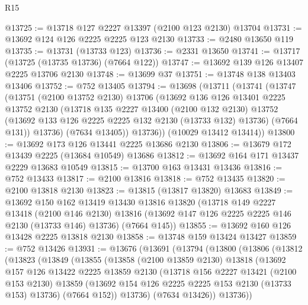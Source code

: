 \begin{lexlean}{R15}
\begin{coremodule}
@13725 := @13718 @127 @2227 @13397 (@2100 @123 @2130) @13704
@13731 := @13692 @124 @126 @2225 @2225 @123 @2130
@13733 := @2480 @13650 @119
@13735 := @13731 (@13733 @123)
@13736 := @2331 @13650
@13741 := @13717 (@13725 (@13735 @13736) (@7664 @122))
@13747 := @13692 @139 @126 @13407 @2225 @13706 @2130
@13748 := @13699 @37
@13751 := @13748 @138 @13403 @13406
@13752 := @752 @13405
@13794 := @13698
    (@13711
      (@13741
        (@13747
          (@13751
            (@2100 @13752 @2130)
            @13706
            (@13692
              @136
              @126
              @13401
              @2225
              @13752
              @2130
              (@13718
                @135
                @2227
                @13400
                (@2100 @132 @2130)
                @13752
                (@13692 @133 @126 @2225 @2225 @132 @2130 (@13733 @132) @13736)
                (@7664 @131))
              @13736)
            (@7634 @13405))
          @13736))
      (@10029 @13412 @13414))
@13800 := @13692 @173 @126 @13441 @2225 @13686 @2130
@13806 := @13679 @172 @13439 @2225 (@13684 @10549) @13686
@13812 := @13692 @164 @171 @13437 @2229 @13683 @10549
@13815 := @13700 @163 @13431 @13436
@13816 := @752 @13433
@13817 := @2100 @13816
@13818 := @752 @13435
@13820 := @2100 @13818 @2130
@13823 := @13815 (@13817 @13820) @13683
@13849 := @13692
    @150
    @162
    @13419
    @13430
    @13816
    @13820
    (@13718
      @149
      @2227
      @13418
      (@2100 @146 @2130)
      @13816
      (@13692 @147 @126 @2225 @2225 @146 @2130 (@13733 @146) @13736)
      (@7664 @145))
@13855 := @13692 @160 @126 @13428 @2225 @13818 @2130
@13858 := @13748 @159 @13424 @13427
@13859 := @752 @13426
@13931 := @13676
    (@13691
      (@13794
        (@13800
          (@13806
            (@13812
              (@13823
                (@13849
                  (@13855
                    (@13858
                      (@2100 @13859 @2130)
                      @13818
                      (@13692
                        @157
                        @126
                        @13422
                        @2225
                        @13859
                        @2130
                        (@13718
                          @156
                          @2227
                          @13421
                          (@2100 @153 @2130)
                          @13859
                          (@13692 @154 @126 @2225 @2225 @153 @2130 (@13733 @153) @13736)
                          (@7664 @152))
                        @13736)
                      (@7634 @13426))
                    @13736))

\end{coremodule}
\end{lexlean}
